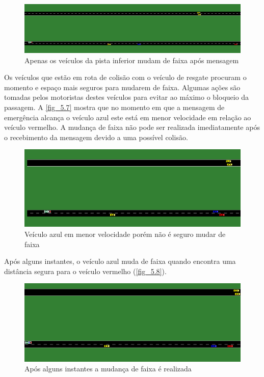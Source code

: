 \documentclass[
12pt,				%
openright,			%
oneside,			%
a4paper,			%
brazil,				%
]{abntex2}
\begin{document}
	\begin{figure}[H]
		\centering
		\includegraphics[scale=.35]{figuras/cap5/56Experimento1SUMO}
		\caption{\label{fig_5.6}Apenas os veículos da pista inferior mudam de faixa após mensagem}
	\end{figure}
	
	\par Os veículos que estão em rota de colisão com o veículo de resgate procuram o momento e espaço mais seguros para mudarem de faixa. Algumas ações são tomadas pelos motoristas destes veículos para evitar ao máximo o bloqueio da passagem. A \autoref{fig_5.7} mostra que no momento em que a mensagem de emergência alcança o veículo azul este está em menor velocidade em relação ao veículo vermelho. A mudança de faixa não pode ser realizada imediatamente após o recebimento da mensagem devido a uma possível colisão. 
	
	\begin{figure}[H]
		\centering
		\includegraphics[scale=.4]{figuras/cap5/57Experimento1SUMO2}
		\caption{\label{fig_5.7} Veículo azul em menor velocidade porém não é seguro mudar de faixa}
	\end{figure}
	
	\par Após alguns instantes, o veículo azul muda de faixa quando encontra uma distância segura para o veículo vermelho (\autoref{fig_5.8}).
	
	\begin{figure}[H]
		\centering
		\includegraphics[scale=.35]{figuras/cap5/58Experimento1SUMO3}
		\caption{\label{fig_5.8} Após alguns instantes a mudança de faixa é realizada}
	\end{figure}
	
\end{document}

